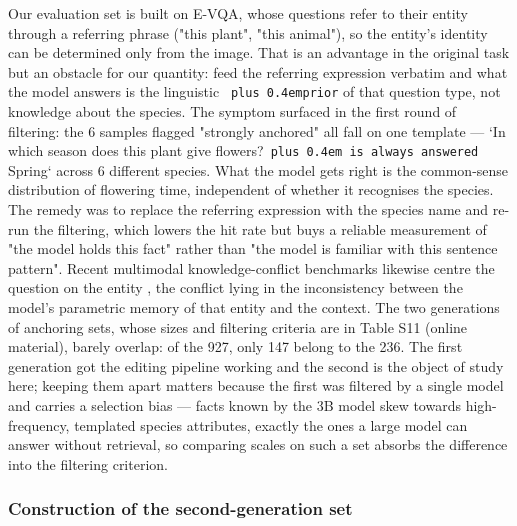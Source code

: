 \documentclass[pdflatex,sn-basic,Numbered]{sn-jnl}
\theoremstyle{thmstyleone}
\theoremstyle{thmstyletwo}
\theoremstyle{thmstylethree}
\DeclareRobustCommand{\code}[1]{\texttt{\spaceskip=0pt plus 0.4em\relax#1}}
\begin{document}
Our evaluation set is built on E-VQA, whose questions refer to their entity through a
referring phrase ("this plant", "this animal"), so the entity's identity can be determined only
from the image. That is an advantage in the original task but an obstacle for our quantity:
feed the referring expression verbatim and what the model answers is the linguistic \code{prior} of
that question type, not knowledge about the species. The symptom surfaced in the first round of
filtering: the 6 samples flagged "strongly anchored" all fall on one template — `In which season
does this plant give flowers?\code{ is always answered }Spring` across 6 different species. What the
model gets right is the common-sense distribution of flowering time, independent of whether it
recognises the species. The remedy was to replace the referring expression with the species
name and re-run the filtering, which lowers the hit rate but buys a reliable measurement of
"the model holds this fact" rather than "the model is familiar with this sentence pattern".
Recent multimodal knowledge-conflict benchmarks likewise centre the question on the entity \cite{ref33},
the conflict lying in the inconsistency between the model's parametric memory of that entity
and the context. The two generations of anchoring sets, whose sizes and filtering criteria are
in Table S11 (online material), barely overlap: of the 927, only 147 belong to the 236.
The first generation got the editing pipeline working and the second is the object of study
here; keeping them apart matters because the first was filtered by a single model and carries a
selection bias — facts known by the 3B model skew towards high-frequency, templated species
attributes, exactly the ones a large model can answer without retrieval, so comparing scales on
such a set absorbs the difference into the filtering criterion.

\subsubsection{Construction of the second-generation set}
\label{sec:4-1-2}
\end{document}
